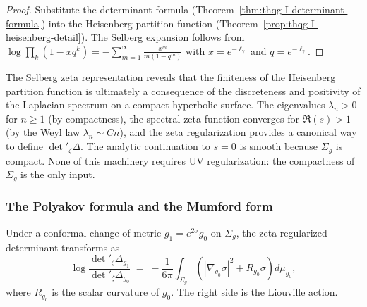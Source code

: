 \begin{proof}
Substitute the determinant formula (Theorem~\ref{thm:thqg-I-determinant-formula}) into the Heisenberg partition function (Theorem~\ref{prop:thqg-I-heisenberg-detail}). The Selberg expansion follows from $\log\prod_k (1-x q^k) = -\sum_{m=1}^\infty \frac{x^m}{m(1-q^m)}$ with $x = e^{-\ell_\gamma}$ and $q = e^{-\ell_\gamma}$.
\end{proof}

\begin{remark}
The Selberg zeta representation reveals that the finiteness of the Heisenberg partition function is ultimately a consequence of the discreteness and positivity of the Laplacian spectrum on a compact hyperbolic surface. The eigenvalues $\lambda_n > 0$ for $n \geq 1$ (by compactness), the spectral zeta function converges for $\Re(s) > 1$ (by the Weyl law $\lambda_n \sim Cn$), and the zeta regularization provides a canonical way to define $\det{}'_\zeta\Delta$. The analytic continuation to $s = 0$ is smooth because $\Sigma_g$ is compact. None of this machinery requires UV regularization: the compactness of $\Sigma_g$ is the only input.
\end{remark}

\subsubsection{The Polyakov formula and the Mumford form}

\begin{proposition}
Under a conformal change of metric $g_1 = e^{2\sigma} g_0$ on $\Sigma_g$, the zeta-regularized determinant transforms as
\begin{equation}%
\log\frac{\det{}'_\zeta \Delta_{g_1}}{\det{}'_\zeta \Delta_{g_0}} \;=\; -\frac{1}{6\pi}\int_{\Sigma_g}\left( |\nabla_{g_0}\sigma|^2 + R_{g_0}\sigma \right) d\mu_{g_0},
\end{equation}
where $R_{g_0}$ is the scalar curvature of $g_0$. The right side is the Liouville action.
\end{proposition}

